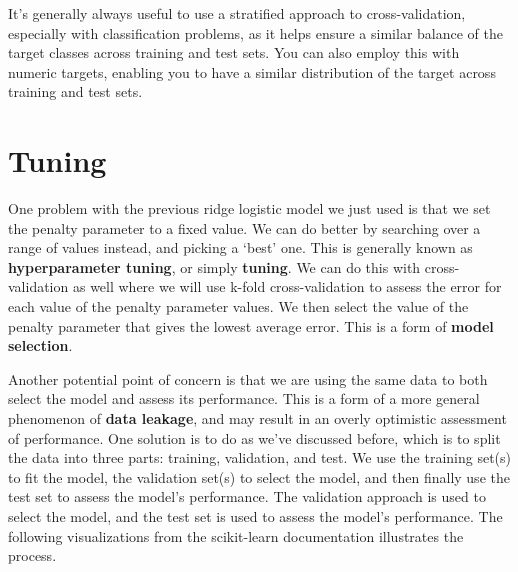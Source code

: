 \documentclass[
  letterpaper,
]{krantz}
\begin{document}
\begin{tcolorbox}[enhanced jigsaw, toprule=.15mm, arc=.35mm, rightrule=.15mm, bottomrule=.15mm, leftrule=.75mm, breakable, colframe=quarto-callout-tip-color-frame, colback=white, left=2mm, opacityback=0]
\begin{minipage}[t]{5.5mm}
\textcolor{quarto-callout-tip-color}{\faLightbulb}
\end{minipage}%
\begin{minipage}[t]{\textwidth - 5.5mm}

It's generally always useful to use a stratified approach to
cross-validation, especially with classification problems, as it helps
ensure a similar balance of the target classes across training and test
sets. You can also employ this with numeric targets, enabling you to
have a similar distribution of the target across training and test sets.

\end{minipage}%
\end{tcolorbox}

\section{Tuning}\label{tuning}

One problem with the previous ridge logistic model we just used is that
we set the penalty parameter to a fixed value. We can do better by
searching over a range of values instead, and picking a `best' one. This
is generally known as \textbf{hyperparameter tuning}, or simply
\textbf{tuning}. We can do this with cross-validation as well where we
will use k-fold cross-validation to assess the error for each value of
the penalty parameter values. We then select the value of the penalty
parameter that gives the lowest average error. This is a form of
\textbf{model selection}.

Another potential point of concern is that we are using the same data to
both select the model and assess its performance. This is a form of a
more general phenomenon of \textbf{data leakage}, and may result in an
overly optimistic assessment of performance. One solution is to do as
we've discussed before, which is to split the data into three parts:
training, validation, and test. We use the training set(s) to fit the
model, the validation set(s) to select the model, and then finally use
the test set to assess the model's performance. The validation approach
is used to select the model, and the test set is used to assess the
model's performance. The following visualizations from the scikit-learn
documentation illustrates the process.
\end{document}
